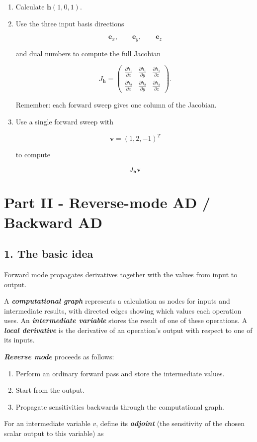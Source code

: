 \documentclass{course_sheet}
\begin{document}
\begin{enumerate}
\item
Calculate $\mathbf h(1,0,1)$.

\item
Use the three input basis directions

\[
\mathbf e_x,
   \qquad
   \mathbf e_y,
   \qquad
   \mathbf e_z
\]

and dual numbers to compute the full Jacobian

\[
J_{\mathbf h}
   =
   \begin{pmatrix}
   \frac{\partial h_1}{\partial x} &
   \frac{\partial h_1}{\partial y} &
   \frac{\partial h_1}{\partial z}\\[4pt]
   \frac{\partial h_2}{\partial x} &
   \frac{\partial h_2}{\partial y} &
   \frac{\partial h_2}{\partial z}
   \end{pmatrix}.
\]

Remember: each forward sweep gives one column of the Jacobian.

\item
Use a single forward sweep with

\[
\mathbf v=(1,2,-1)^T
\]

to compute

\[
J_{\mathbf h}\mathbf v
\]

\end{enumerate}
\clearpage
\section*{Part II - Reverse-mode AD / Backward AD}
\subsection*{1. The basic idea}
Forward mode propagates derivatives together with the values from input to output.

A \textbf{\textit{computational graph}} represents a calculation as nodes for inputs and intermediate results, with directed edges showing which values each operation uses. An \textbf{\textit{intermediate variable}} stores the result of one of these operations. A \textbf{\textit{local derivative}} is the derivative of an operation's output with respect to one of its inputs.

\textbf{\textit{Reverse mode}} proceeds as follows:

\begin{enumerate}
\item
Perform an ordinary forward pass and store the intermediate values.

\item
Start from the output.

\item
Propagate sensitivities backwards through the computational graph.

\end{enumerate}
For an intermediate variable $v$, define its \textbf{\textit{adjoint}} (the sensitivity of the chosen scalar output to this variable) as
\end{document}
